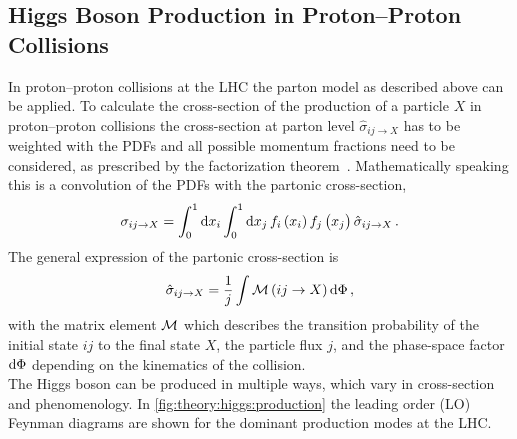\subsection{Higgs Boson Production in Proton--Proton Collisions}
\label{sub:theory:higgs:production}

In proton--proton collisions at the LHC the parton model as described above can be applied.
To calculate the cross-section of the production of a particle $X$ in proton--proton collisions the
cross-section at parton level $\hat{\sigma}_{ij\to X}$ has to be weighted with the PDFs and all
possible momentum fractions need to be considered, as prescribed by the factorization theorem~\cite{DRELL1971578}.
Mathematically speaking this is a convolution of the PDFs with the partonic cross-section,
\begin{equation}
    \sigma_{ij\to X} = \int_{0}^{1} \dif x_i \int_{0}^{1} \dif x_j \,
    f_i \left( x_i \right ) f_j \left( x_j \right ) \hat{\sigma}_{ij\to X} \,.
\end{equation}
The general expression of the partonic cross-section is~\cite{Griffiths}
\begin{equation}
    \hat{\sigma}_{ij\to X} = \frac{1}{j} \int \matrixm \left(ij \to X \right) \dif \Phi \,,
\end{equation}
with the matrix element $\mathcal{M}$ which describes the transition probability of the initial state $ij$ to the final state $X$, the
particle flux $j$, and the phase-space factor $\dif \Phi$ depending on the kinematics of the collision.
\\[\baselineskip]
The Higgs boson can be produced in multiple ways, which vary in cross-section and phenomenology.
In \cref{fig:theory:higgs:production} the leading order (LO) Feynman diagrams are shown for the dominant production modes
at the LHC\@.


